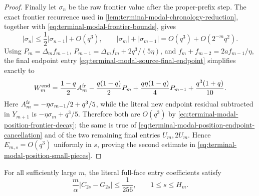 \begin{proof}
Finally let $\sigma_n$ be the raw frontier value after the proper-prefix
step.  The exact frontier recurrence used in
\cref{lem:terminal-modal-chronology-reduction}, together with
\eqref{eq:terminal-modal-frontier-bounds}, gives
\begin{equation}
 |\sigma_n|\le\frac12|\sigma_{n-1}|+O(q^3),
 \qquad
 |\sigma_m|+|\sigma_{m-1}|=O(q^3)+O(2^{-m}q^2).
 \label{eq:terminal-modal-position-frontier-decay}
\end{equation}
Using $P_m=\Delta_mf_{m-1}$,
$P_{m-1}=\Delta_mf_m+2q^3/(5\eta)$, and
$f_m+f_{m-2}=2af_{m-1}/\eta$, the final endpoint entry
\eqref{eq:terminal-modal-source-final-endpoint} simplifies exactly to
\begin{equation}
 W_m^{\rm end}
 =\frac{1-q}{2}A_m^{\rm fr}
 -\frac{q(1-q)}2P_m
 +\frac{q\eta(1-q)}4P_{m-1}
 +\frac{q^3(1+q)}{10}.
 \label{eq:terminal-modal-position-endpoint-cancellation}
\end{equation}
Here $A_m^{\rm fr}=-\eta\sigma_{m-1}/2+q^3/5$, while the literal new endpoint
residual subtracted in $Y_{m+1}$ is $-\eta\sigma_m+q^3/5$.  Therefore both
are $O(q^3)$ by \eqref{eq:terminal-modal-position-frontier-decay}; the same is
true of \eqref{eq:terminal-modal-position-endpoint-cancellation} and of the
two remaining final entries $U_m,2U_m$.  Hence $E_{m,s}=O(q^3)$ uniformly in
$s$, proving the second estimate in
\eqref{eq:terminal-modal-position-small-pieces}.
\end{proof}

\begin{theorem}
\label{lem:terminal-modal-position-profile}
For all sufficiently large $m$, the literal full-face entry coefficients
satisfy
\begin{equation}
 \frac m\alpha|C_{2s}-G_{2s}|\le\frac1{256},
 \qquad 1\le s\le H_m.
 \label{eq:terminal-modal-entry-position-profile}
\end{equation}
\end{theorem}

